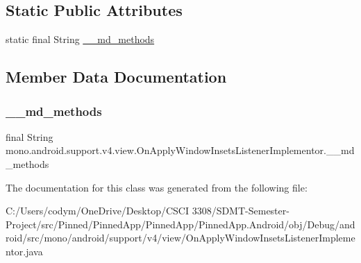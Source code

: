 \subsection*{Static Public Attributes}
\begin{DoxyCompactItemize}
\item 
static final String \hyperlink{classmono_1_1android_1_1support_1_1v4_1_1view_1_1_on_apply_window_insets_listener_implementor_a9d2e89b4e2dcf4aea44200c6427f14a4}{\+\_\+\+\_\+md\+\_\+methods}
\end{DoxyCompactItemize}


\subsection{Member Data Documentation}
\mbox{\label{classmono_1_1android_1_1support_1_1v4_1_1view_1_1_on_apply_window_insets_listener_implementor_a9d2e89b4e2dcf4aea44200c6427f14a4}} 
\subsubsection{\texorpdfstring{\+\_\+\+\_\+md\+\_\+methods}{\_\_md\_methods}}
{\footnotesize\ttfamily final String mono.\+android.\+support.\+v4.\+view.\+On\+Apply\+Window\+Insets\+Listener\+Implementor.\+\_\+\+\_\+md\+\_\+methods\hspace{0.3cm}{\ttfamily [static]}}



The documentation for this class was generated from the following file\+:\begin{DoxyCompactItemize}
\item 
C\+:/\+Users/codym/\+One\+Drive/\+Desktop/\+C\+S\+C\+I 3308/\+S\+D\+M\+T-\/\+Semester-\/\+Project/src/\+Pinned/\+Pinned\+App/\+Pinned\+App/\+Pinned\+App.\+Android/obj/\+Debug/android/src/mono/android/support/v4/view/On\+Apply\+Window\+Insets\+Listener\+Implementor.\+java\end{DoxyCompactItemize}

